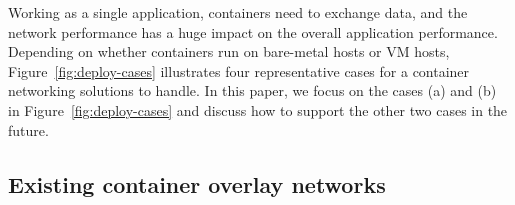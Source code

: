 Working as a single application, containers need to exchange data, and the network performance has a huge impact on the overall application performance.
Depending on whether 
containers run on bare-metal hosts or VM hosts, Figure~\ref{fig:deploy-cases}
illustrates four representative cases for a container networking solutions
to handle. 
In this paper, 
we focus on the cases (a) and (b) in Figure~\ref{fig:deploy-cases} and discuss how to support the other two cases in the future.




\subsection{Existing container overlay networks}



